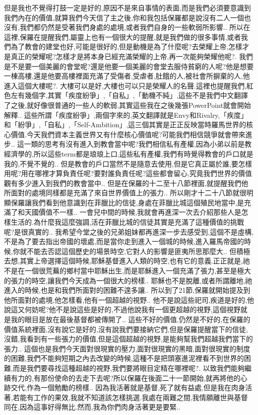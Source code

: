 \documentclass{book}
\begin{document}
但是我也不覺得打鼓一定是好的,原因不是來自事情的表面,而是我們必須要意識到我們內在的價值,就算我們今天信了主之後,你和我包括保羅都是說沒有二人一個也沒有,我們都仍然是受著我們身處的處境,或者我們自身的一些軟弱所影響..
所以在這裡,保羅在提醒我們,屬靈上也有一個很大的提醒,就是我們做的很多事情,或者我們為了教會的建堂也好,可能是很好的,但是動機是為了什麼呢?去榮耀上帝,怎樣才是真正的榮耀呢?怎樣才是將本身已經充滿榮耀的上帝,再一次能夠榮耀他呢?.
我們是不是要一個美麗的會堂呢?還是他要一個美麗的會堂去服侍貧窮的人呢?他是想要一棟高樓,還是他要高樓裡面充滿了受傷者,受虐者,肚餓的人,被社會所摒棄的人,他進入這個大樓呢?.
大樓可以是好,大樓也可以只是榮耀人的名聲.這裡也提醒我們,紅色左有幾個字,其實「疾度紛爭」,「自私」,「動機不純」,這些不是我們中文翻譯了之後,就好像很普通的一些人的軟弱,其實這些我在之後幾張PowerPoint就會開始解釋..
這些所謂「疾度紛爭」,兩個字來的,英文翻譯就是Envy和Rivalry,「疾度」和「紛爭」,「自私」,「Self-Ambition」,這三個其實是正正反映當時羅馬世界的核心價值.今天我們資本主義世界又有什麼核心價值呢?可能我們相信競爭就會帶來進步..
這一類的思考有沒有進入到教會當中呢?我們相信私有產權,因為小弟以前是教經濟學的,所以這些term都是琅琅上口,這些私有產權,我們有時覺得教會的戶口就是我的,不覺不覺的..
但是教會的戶口當然不是隨意去使用,但是它真正屬於誰,要怎樣用呢?用在哪裡才算負責任呢?要對誰負責任呢?這些都會留心,究竟我們世界的價值觀有多少進入到我們的教會當中..
但是在保羅的十二至十八節裡面,就提醒我們他所面對的處境同樣都是充滿了來自世界價值上的張力..
所以剛才十二十八節就很明顯保羅讓我們看到他意識到在菲臘比的信徒,身處在菲臘比城這個殖民地當中,是充滿了和天國價值不一樣..
一會兒中間的時候,我就會再進深一次去介紹那些人是怎樣生活的.為什麼我這麼強調,活在菲臘比城的信徒其實是充滿了這種價值的挑戰呢?是很真實的..
我希望今堂之後的兄弟姐妹都再進深一步去感受到,這個不是虛構,不是為了要去指出帝國的壞處,而是當你走到進入一個城的時候,進入羅馬帝國的時候,你就不能去否認這個歷史的場景時空,它對人的影響是匪夷所思那麼大..
但積極去想,其實上帝選擇這個時候,耶穌基督進入人類的時空,也有它的意義.正正就是,祂不是在一個很荒蕪的鄉村當中耶穌出生,而是耶穌進入一個充滿了張力,甚至是極大的張力的時空,讓我們今天成為一個很大的榜樣..
耶穌也不是脫離,或者所謂離地,祂進入的時候,也是和我們所面對的困難不遑多讓..
所以到了21節,保羅就開始提及到他所面對的處境,他怎樣看,他有一個超越的視野..
他不是說這些祀司,疾道是好的,他說這又何妨呢?他不是說這些是好的,不過他說我有一個更超越的視野,這個視野就是我的眼目是放在最後基督都被傳開了..
這些不好的價值,仍然是不好的,在保羅的價值系統裡面,沒有說它是好的,沒有說我們要接納它們,但是保羅提醒當下的信徒,沒錯,我看到有一些張力的價值,但是這個超越的視野,是能夠幫我們超越我們當下的張力..
這個也是我們今天面對很現實的壓力,面對很現實的黑暗,面對很現實的制度的困難,我們不能夠短期之內去改變的時候,這種不是把頭塞進泥裡看不到世界的困難,而是我們要尋找這種超越的視野,我們要將眼目定精在哪裡呢?.
以致我們能夠繼續有力的,有那份使命的去走下去呢?所以保羅在後面二十一節開始,就再將他的心跡交代,作為一個勉勵的榜樣..
因為我活著就是基督,死了就有益處,但是我在肉身活著,若能有工作的果效,我就不知道該怎樣挑選.我處在兩難之間,我情願離世與基督同在,因為這事好得無比.然而,我為你們肉身活著更是要緊..
\end{document}
